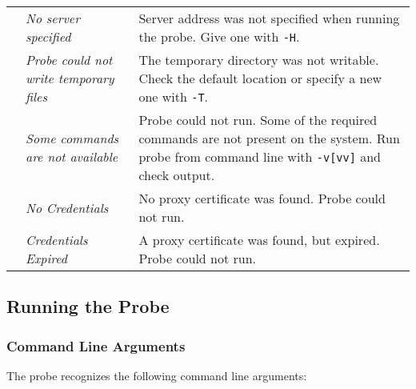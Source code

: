 \begin{tabularx}{\textwidth}{|c|p{5cm}|X|}
& \emph{No server specified} & Server address was not specified when running the probe. Give one with \texttt{-H}. \\
& \emph{Probe could not write temporary files} & The temporary directory was not writable. Check the default location or specify a new one with \texttt{-T}.\\
& \emph{Some commands are not available} & Probe could not run. Some of the required commands are not present on the system. Run probe from command line with \texttt{-v[vv]} and check output. \\
& \emph{No Credentials} & No proxy certificate was found. Probe could not run. \\
& \emph{Credentials Expired} & A proxy certificate was found, but expired. Probe could not run. \\
\hline
\end{tabularx}

\subsection{Running the Probe}

\subsubsection{Command Line Arguments}
The probe recognizes the following command line arguments:

